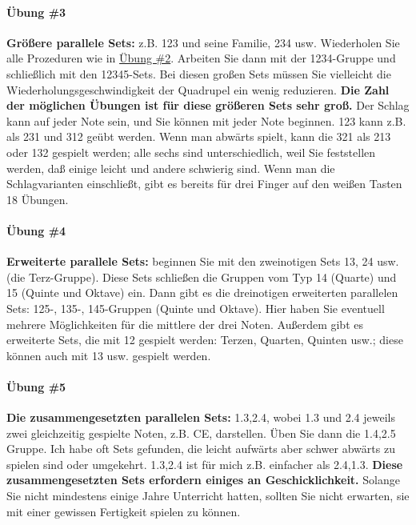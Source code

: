 \paragraph{Übung \#3}
\label{c1iii7b3}

\textbf{Größere parallele Sets:} z.B. 123 und seine Familie, 234 usw.
Wiederholen Sie alle Prozeduren wie in \hyperref[c1iii7b2]{Übung \#2}.
Arbeiten Sie dann mit der 1234-Gruppe und schließlich mit den 12345-Sets.
Bei diesen großen Sets müssen Sie vielleicht die Wiederholungsgeschwindigkeit der Quadrupel ein wenig reduzieren.
\textbf{Die Zahl der möglichen Übungen ist für diese größeren Sets sehr groß.}
Der Schlag kann auf jeder Note sein, und Sie können mit jeder Note beginnen.
123 kann z.B. als 231 und 312 geübt werden.
Wenn man abwärts spielt, kann die 321 als 213 oder 132 gespielt werden; alle sechs sind unterschiedlich, weil Sie feststellen werden, daß einige leicht und andere schwierig sind.
Wenn man die Schlagvarianten einschließt, gibt es bereits für drei Finger auf den weißen Tasten 18 Übungen.


\paragraph{Übung \#4}
\label{c1iii7b4}

\textbf{Erweiterte parallele Sets:} beginnen Sie mit den zweinotigen Sets 13, 24 usw. (die Terz-Gruppe).
Diese Sets schließen die Gruppen vom Typ 14 (Quarte) und 15 (Quinte und Oktave) ein.
Dann gibt es die dreinotigen erweiterten parallelen Sets: 125-, 135-, 145-Gruppen (Quinte und Oktave).
Hier haben Sie eventuell mehrere Möglichkeiten für die mittlere der drei Noten.
Außerdem gibt es erweiterte Sets, die mit 12 gespielt werden: Terzen, Quarten, Quinten usw.; diese können auch mit 13 usw. gespielt werden.


\paragraph{Übung \#5}
\label{c1iii7b5}

\textbf{Die zusammengesetzten parallelen Sets:} 1.3,2.4, wobei 1.3 und 2.4 jeweils zwei gleichzeitig gespielte Noten, z.B. CE, darstellen.
Üben Sie dann die 1.4,2.5 Gruppe.
Ich habe oft Sets gefunden, die leicht aufwärts aber schwer abwärts zu spielen sind oder umgekehrt.
1.3,2.4 ist für mich z.B. einfacher als 2.4,1.3.
\textbf{Diese zusammengesetzten Sets erfordern einiges an Geschicklichkeit.}
Solange Sie nicht mindestens einige Jahre Unterricht hatten, sollten Sie nicht erwarten, sie mit einer gewissen Fertigkeit spielen zu können.

